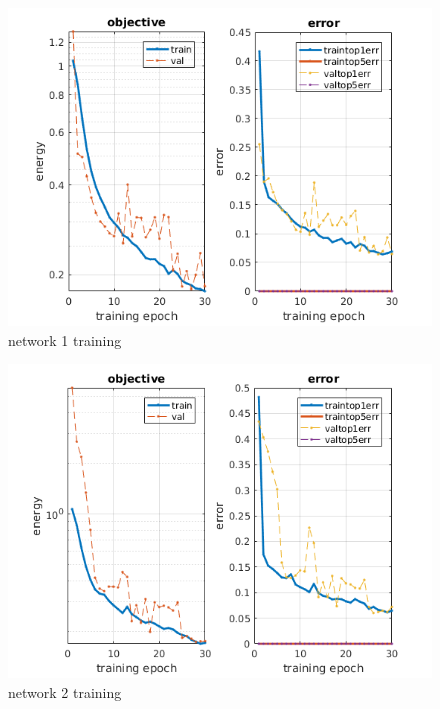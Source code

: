 \documentclass[]{report}
\begin{document}
\begin{figure}[h]
	\begin{center}
		\includegraphics[scale=0.8]{init_1.png}
		\caption{network 1 training}
		\label{fig:training1}
	\end{center}
\end{figure}

\begin{figure}[h]
	\begin{center}
		\includegraphics[scale=0.8]{init_2.png}
		\caption{network 2 training}
		\label{fig:training1}
	\end{center}
\end{figure}
\end{document}
